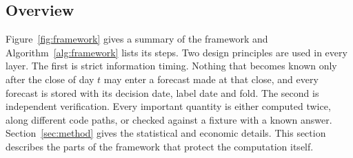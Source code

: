 \documentclass[preprint,12pt,authoryear,a4paper]{elsarticle}
\begin{document}
\subsection{Overview}

Figure~\ref{fig:framework} gives a summary of the framework and
Algorithm~\ref{alg:framework} lists its steps. Two design principles are used in
every layer. The first is strict information timing. Nothing that becomes known
only after the close of day $t$ may enter a forecast made at that close, and every
forecast is stored with its decision date, label date and fold. The second is
independent verification. Every important quantity is either computed twice, along
different code paths, or checked against a fixture with a known answer.
Section~\ref{sec:method} gives the statistical and economic details. This section
describes the parts of the framework that protect the computation itself.
\end{document}

